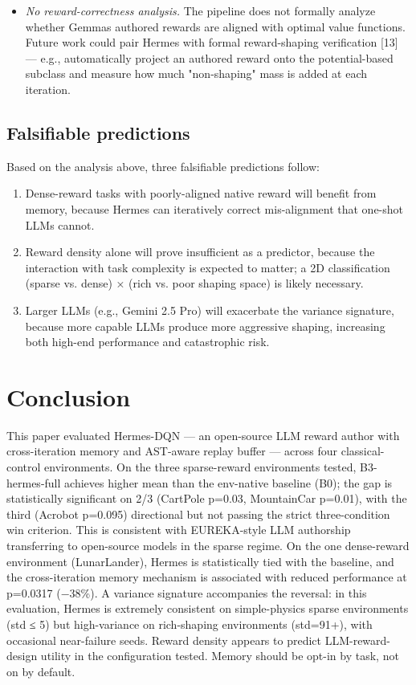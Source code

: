 \documentclass[conference,letterpaper,10pt]{IEEEtran}
\providecommand{\tightlist}{\setlength{\itemsep}{0pt}\setlength{\parskip}{0pt}}
\begin{document}
\begin{itemize}
\item
  \emph{No reward-correctness analysis.} The pipeline does not formally analyze whether Gemma\textquotesingle s authored rewards are aligned with optimal value functions. Future work could pair Hermes with formal reward-shaping verification {[}13{]} --- e.g., automatically project an authored reward onto the potential-based subclass and measure how much "non-shaping" mass is added at each iteration.
\end{itemize}

\subsection{Falsifiable predictions}

Based on the analysis above, three falsifiable predictions follow:

\begin{enumerate}
\def\labelenumi{\arabic{enumi}.}
\tightlist
\item
  Dense-reward tasks with poorly-aligned native reward will benefit from memory, because Hermes can iteratively correct mis-alignment that one-shot LLMs cannot.
\item
  Reward density alone will prove insufficient as a predictor, because the interaction with task complexity is expected to matter; a 2D classification (sparse vs. dense) × (rich vs. poor shaping space) is likely necessary.
\item
  Larger LLMs (e.g., Gemini 2.5 Pro) will exacerbate the variance signature, because more capable LLMs produce more aggressive shaping, increasing both high-end performance and catastrophic risk.
\end{enumerate}


\section{Conclusion}

This paper evaluated Hermes-DQN --- an open-source LLM reward author with cross-iteration memory and AST-aware replay buffer --- across four classical-control environments. On the three sparse-reward environments tested, B3-hermes-full achieves higher mean than the env-native baseline (B0); the gap is statistically significant on 2/3 (CartPole p=0.03, MountainCar p=0.01), with the third (Acrobot p=0.095) directional but not passing the strict three-condition win criterion. This is consistent with EUREKA-style LLM authorship transferring to open-source models in the sparse regime. On the one dense-reward environment (LunarLander), Hermes is statistically tied with the baseline, and the cross-iteration memory mechanism is associated with reduced performance at p=0.0317 (−38\%). A variance signature accompanies the reversal: in this evaluation, Hermes is extremely consistent on simple-physics sparse environments (std ≤ 5) but high-variance on rich-shaping environments (std=91+), with occasional near-failure seeds. Reward density appears to predict LLM-reward-design utility in the configuration tested. Memory should be opt-in by task, not on by default.
\end{document}
